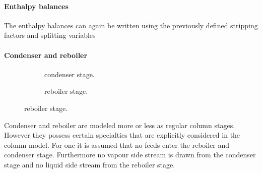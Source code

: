 	\paragraph{Enthalpy balances}
        The enthalpy balances can again be written using the previously defined stripping factors
        and splitting variables

    \paragraph{Condenser and reboiler}
        \begin{figure}
            \centering
            \begin{subfigure}{0.45\textwidth}
                \centering
                
                \caption{condenser stage.}
                \label{fig:col_condenser}
            \end{subfigure}
            \begin{subfigure}{0.45\textwidth}
                \centering
                
                \caption{reboiler stage.}
                \label{fig:col_reboiler}
            \end{subfigure}
        \end{figure}

        Condenser and reboiler are modeled more or less as regular column stages. However they possess
        certain specialties that are explicitly considered in the column model. For one it is assumed
        that no feeds enter the reboiler and condenser stage. Furthermore no vapour side stream is
        drawn from the condenser stage and no liquid side stream from the reboiler stage.


